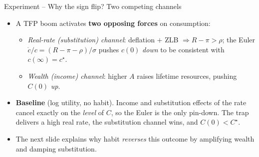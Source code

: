 \documentclass[11pt,aspectratio=169]{beamer}
\begin{document}
\begin{frame}{Experiment -- Why the sign flip? Two competing channels}

\begin{itemize}

\item A TFP boom activates \textbf{two opposing forces} on consumption:
  \begin{itemize}
  \item \emph{Real-rate (substitution) channel}: deflation $+$ ZLB
    $\Rightarrow R - \pi > \rho$; the Euler
    $\dot c/c = (R-\pi-\rho)/\sigma$ pushes $c(0)$ \emph{down} to be
    consistent with $c(\infty)=c^\star$.\newline
  \item \emph{Wealth (income) channel}: higher $A$ raises lifetime
    resources, pushing $C(0)$ \emph{up}.
  \end{itemize}

\item \textbf{Baseline} (log utility, no habit). Income and substitution
  effects of the rate cancel exactly on the \emph{level} of $C$, so the
  Euler is the only pin-down. The trap delivers a high real rate, the
  substitution channel wins, and $C(0) < C^\star$.\newline

\item The next slide explains why habit \emph{reverses} this outcome
  by amplifying wealth and damping substitution.

\end{itemize}

\end{frame}
\end{document}

